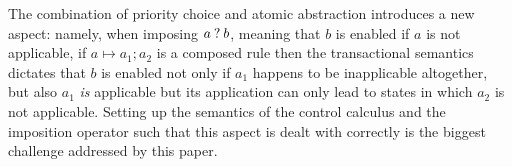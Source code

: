 The combination of priority choice and atomic abstraction introduces a new aspect: namely, when imposing $a\mathbin{?} b$, meaning that $b$ is enabled if $a$ is not applicable, if $a\mapsto a_1;a_2$ is a composed rule then the transactional semantics dictates that $b$ is enabled not only if $a_1$ happens to be inapplicable altogether, but also $a_1$ \emph{is} applicable but its application can only lead to states in which $a_2$ is not applicable. Setting up the semantics of the control calculus and the imposition operator such that this aspect is dealt with correctly is the biggest challenge addressed by this paper.
